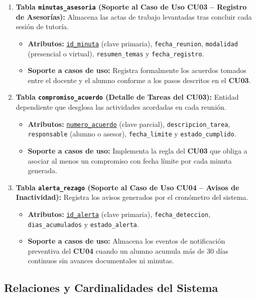 \begin{enumerate}
    \item \textbf{Tabla \texttt{minutas\_asesoria} (Soporte al Caso de Uso CU03 -- Registro de Asesorías):}
    Almacena las actas de trabajo levantadas tras concluir cada sesión de tutoría.
    \begin{itemize}
        \item \textbf{Atributos:} \underline{\texttt{id\_minuta}} (clave primaria), \texttt{fecha\_reunion}, \texttt{modalidad} (presencial o virtual), \texttt{resumen\_temas} y \texttt{fecha\_registro}.
        \item \textbf{Soporte a casos de uso:} Registra formalmente los acuerdos tomados entre el docente y el alumno conforme a los pasos descritos en el \textbf{CU03}.
    \end{itemize}

    \item \textbf{Tabla \texttt{compromiso\_acuerdo} (Detalle de Tareas del CU03):}
    Entidad dependiente que desglosa las actividades acordadas en cada reunión.
    \begin{itemize}
        \item \textbf{Atributos:} \underline{\texttt{numero\_acuerdo}} (clave parcial), \texttt{descripcion\_tarea}, \texttt{responsable} (alumno o asesor), \texttt{fecha\_limite} y \texttt{estado\_cumplido}.
        \item \textbf{Soporte a casos de uso:} Implementa la regla del \textbf{CU03} que obliga a asociar al menos un compromiso con fecha límite por cada minuta generada.
    \end{itemize}

    \item \textbf{Tabla \texttt{alerta\_rezago} (Soporte al Caso de Uso CU04 -- Avisos de Inactividad):}
    Registra los avisos generados por el cronómetro del sistema.
    \begin{itemize}
        \item \textbf{Atributos:} \underline{\texttt{id\_alerta}} (clave primaria), \texttt{fecha\_deteccion}, \texttt{dias\_acumulados} y \texttt{estado\_alerta}.
        \item \textbf{Soporte a casos de uso:} Almacena los eventos de notificación preventiva del \textbf{CU04} cuando un alumno acumula más de 30 días continuos sin avances documentales ni minutas.
    \end{itemize}
\end{enumerate}

\subsection{Relaciones y Cardinalidades del Sistema}
\label{subsec:relaciones_bd}

